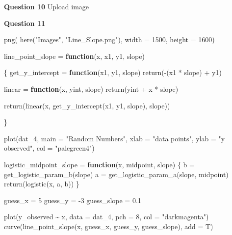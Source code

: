 \documentclass[
]{article}
\newenvironment{Shaded}{\begin{snugshade}}{\end{snugshade}}
\newcommand{\AttributeTok}[1]{\textcolor[rgb]{0.77,0.63,0.00}{#1}}
\newcommand{\ControlFlowTok}[1]{\textcolor[rgb]{0.13,0.29,0.53}{\textbf{#1}}}
\newcommand{\DecValTok}[1]{\textcolor[rgb]{0.00,0.00,0.81}{#1}}
\newcommand{\FloatTok}[1]{\textcolor[rgb]{0.00,0.00,0.81}{#1}}
\newcommand{\FunctionTok}[1]{\textcolor[rgb]{0.00,0.00,0.00}{#1}}
\newcommand{\NormalTok}[1]{#1}
\newcommand{\OtherTok}[1]{\textcolor[rgb]{0.56,0.35,0.01}{#1}}
\newcommand{\SpecialCharTok}[1]{\textcolor[rgb]{0.00,0.00,0.00}{#1}}
\newcommand{\StringTok}[1]{\textcolor[rgb]{0.31,0.60,0.02}{#1}}
\begin{document}
\textbf{Question 10} Upload image

\textbf{Question 11}

\begin{Shaded}
\begin{Highlighting}[]
\FunctionTok{png}\NormalTok{(}
  \FunctionTok{here}\NormalTok{(}\StringTok{"Images"}\NormalTok{, }\StringTok{"Line\_Slope.png"}\NormalTok{),}
  \AttributeTok{width =} \DecValTok{1500}\NormalTok{, }\AttributeTok{height =} \DecValTok{1600}\NormalTok{)}

\NormalTok{line\_point\_slope }\OtherTok{=} \ControlFlowTok{function}\NormalTok{(x, x1, y1, slope)}
  
\NormalTok{\{}
\NormalTok{  get\_y\_intercept }\OtherTok{=} 
    \ControlFlowTok{function}\NormalTok{(x1, y1, slope) }
      \FunctionTok{return}\NormalTok{(}\SpecialCharTok{{-}}\NormalTok{(x1 }\SpecialCharTok{*}\NormalTok{ slope) }\SpecialCharTok{+}\NormalTok{ y1)}
  
\NormalTok{  linear }\OtherTok{=} 
    \ControlFlowTok{function}\NormalTok{(x, yint, slope) }
      \FunctionTok{return}\NormalTok{(yint }\SpecialCharTok{+}\NormalTok{ x }\SpecialCharTok{*}\NormalTok{ slope)}
  
  \FunctionTok{return}\NormalTok{(}\FunctionTok{linear}\NormalTok{(x, }\FunctionTok{get\_y\_intercept}\NormalTok{(x1, y1, slope), slope))}
  
\NormalTok{\}}

\FunctionTok{plot}\NormalTok{(dat\_4, }\AttributeTok{main =} \StringTok{"Random Numbers"}\NormalTok{, }\AttributeTok{xlab =} \StringTok{"data points"}\NormalTok{, }\AttributeTok{ylab =} \StringTok{"y observed"}\NormalTok{, }\AttributeTok{col =} \StringTok{"palegreen4"}\NormalTok{)}

\NormalTok{logistic\_midpoint\_slope }\OtherTok{=} \ControlFlowTok{function}\NormalTok{(x, midpoint, slope)}
\NormalTok{\{}
\NormalTok{  b }\OtherTok{=} \FunctionTok{get\_logistic\_param\_b}\NormalTok{(slope)}
\NormalTok{  a }\OtherTok{=} \FunctionTok{get\_logistic\_param\_a}\NormalTok{(slope, midpoint)}
  \FunctionTok{return}\NormalTok{(}\FunctionTok{logistic}\NormalTok{(x, a, b))}
\NormalTok{\}}

\NormalTok{guess\_x }\OtherTok{=} \DecValTok{5}
\NormalTok{guess\_y }\OtherTok{=} \SpecialCharTok{{-}}\DecValTok{3}
\NormalTok{guess\_slope }\OtherTok{=} \FloatTok{0.1}

\FunctionTok{plot}\NormalTok{(y\_observed }\SpecialCharTok{\textasciitilde{}}\NormalTok{ x, }\AttributeTok{data =}\NormalTok{ dat\_4, }\AttributeTok{pch =} \DecValTok{8}\NormalTok{, }\AttributeTok{col =} \StringTok{"darkmagenta"}\NormalTok{)}
\FunctionTok{curve}\NormalTok{(}\FunctionTok{line\_point\_slope}\NormalTok{(x, guess\_x, guess\_y, guess\_slope), }\AttributeTok{add =}\NormalTok{ T)}
\end{Highlighting}
\end{Shaded}
\end{document}
